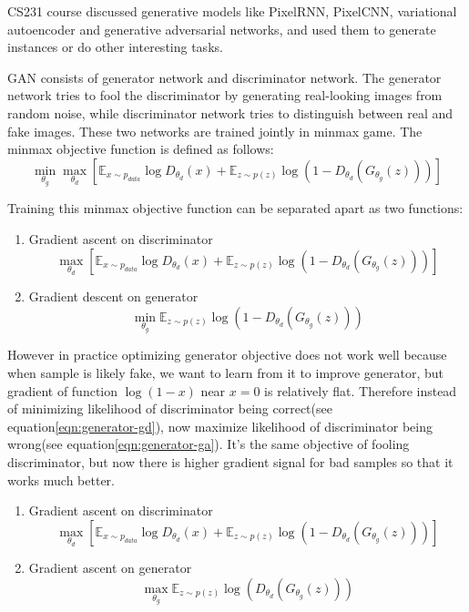 \documentclass{article} %
\begin{document}
CS231 course discussed generative models like PixelRNN, PixelCNN, variational autoencoder and generative adversarial networks, and used them to generate instances or do other interesting tasks. 

GAN consists of generator network and discriminator network. The generator network tries to fool the discriminator by generating real-looking images from random noise, while discriminator network tries to distinguish between real and fake images. These two networks are trained jointly in minmax game. The minmax objective function is defined as follows:
$$\min_{\theta_g} \max_{\theta_d}\left[\mathbb{E}_{x \sim p_{data}} \log D_{\theta_d}(x) + \mathbb{E}_{z \sim p(z)} \log(1-D_{\theta_d}(G_{\theta_g}(z)))\right]$$

Training this minmax objective function can be separated apart as two functions:
\begin{enumerate}
	\item Gradient ascent on discriminator
		\begin{equation*}
		\max_{\theta_d}\left[\mathbb{E}_{x \sim p_{data}} \log D_{\theta_d}(x) + \mathbb{E}_{z \sim p(z)} \log(1-D_{\theta_d}(G_{\theta_g}(z)))\right]
		\end{equation*}
	\item Gradient descent on generator
		\begin{equation}		
		\min_{\theta_g}\mathbb{E}_{z \sim p(z)}\log(1-D_{\theta_d}(G_{\theta_g}(z)))
		\label{eqn:generator-gd}
		\end{equation}
\end{enumerate}

However in practice optimizing generator objective does not work well because when sample is likely fake, we want to learn from it to improve generator, but gradient of function $\log(1-x)$ near $x=0$ is relatively flat. Therefore instead of minimizing likelihood of discriminator being correct(see equation\ref{eqn:generator-gd}), now maximize likelihood of discriminator being wrong(see equation\ref{eqn:generator-ga}). It's the same objective of fooling discriminator, but now there is higher gradient signal for bad samples so that it works much better.

\begin{enumerate}
	\item Gradient ascent on discriminator
	\begin{equation}
	\max_{\theta_d}\left[\mathbb{E}_{x \sim p_{data}} \log D_{\theta_d}(x) + \mathbb{E}_{z \sim p(z)} \log(1-D_{\theta_d}(G_{\theta_g}(z)))\right]
	\label{eqn:discriminator-ga}
	\end{equation}
	\item Gradient ascent on generator
	\begin{equation}		
	\max_{\theta_g}\mathbb{E}_{z \sim p(z)}\log(D_{\theta_d}(G_{\theta_g}(z)))
	\label{eqn:generator-ga}
	\end{equation}
\end{enumerate}
\end{document}
